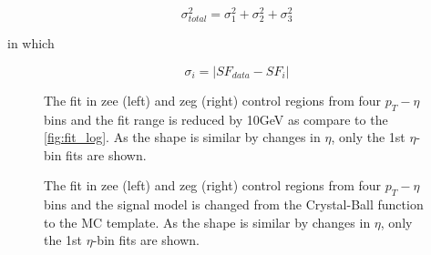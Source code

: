 \begin{equation}
\sigma_{total}^{2} = \sigma_{1}^{2} + \sigma_{2}^{2} + \sigma_{3}^{2}
\label{eqn:systematics}
\end{equation}

in which

\begin{equation}
\sigma_{i} = |SF_{data} - SF_{i}|
\label{eqn:systematic}
\end{equation}

\begin{figure}[H]
\begin{center}
\scalebox{0.35}{}\scalebox{0.35}{}
\scalebox{0.35}{}\scalebox{0.35}{}
\scalebox{0.35}{}\scalebox{0.35}{}
\scalebox{0.35}{}\scalebox{0.35}{}
\caption{The fit in zee (left) and zeg (right) control regions from four $p_{T}-\eta$ bins and the fit range is reduced by 10GeV as compare to the \ref{fig:fit_log}. As the shape is similar by changes in $\eta$, only the 1st $\eta$-bin fits are shown.}
\label{fig:fit_sys1}
\end{center}
\end{figure}

\begin{figure}[H]
\begin{center}
\scalebox{0.35}{}\scalebox{0.35}{}
\scalebox{0.35}{}\scalebox{0.35}{}
\scalebox{0.35}{}\scalebox{0.35}{}
\scalebox{0.35}{}\scalebox{0.35}{}
\caption{The fit in zee (left) and zeg (right) control regions from four $p_{T}-\eta$ bins and the signal model is changed from the Crystal-Ball function to the MC template. As the shape is similar by changes in $\eta$, only the 1st $\eta$-bin fits are shown.}
\label{fig:fit_sys2}
\end{center}
\end{figure}

